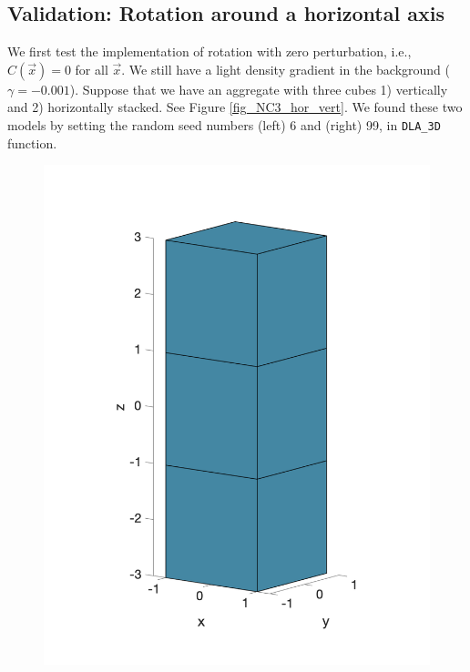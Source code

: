 \subsection{Validation: Rotation around a horizontal axis}\label{validation_rot}
We first test the implementation of rotation with zero perturbation, i.e.,  $C(\vec{x}) = 0$ for all $\vec{x}$. 
We still have a light density gradient in the background ($\gamma = - 0.001$). Suppose that we have an aggregate with three cubes 1) vertically and 2) horizontally stacked. See Figure \ref{fig_NC3_hor_vert}. We found these two models by setting the random seed numbers (left) 6 and (right) 99, in \verb+DLA_3D+ function. 
    \begin{figure}[h]
    	\begin{center}
    		\vspace{0.5cm}
			\includegraphics[scale=0.25]{./figures/fig_NC3_ver}		
			\hspace{20mm}

\end{center}
\end{figure}
